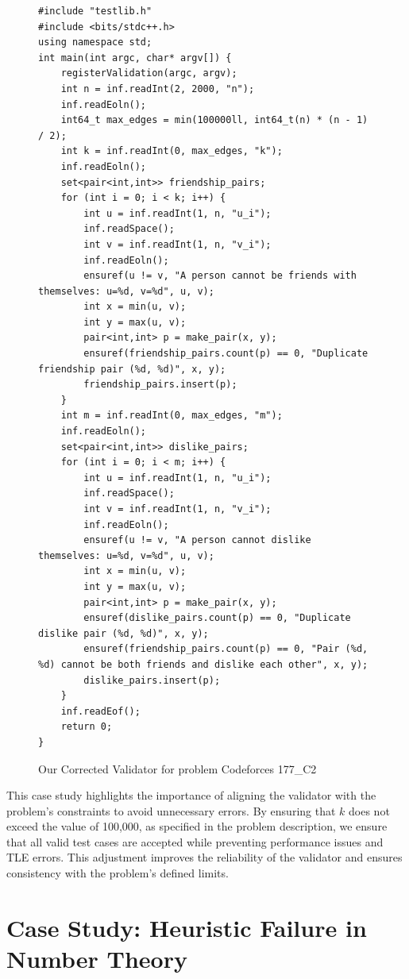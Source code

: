 \documentclass[11pt]{article}
\begin{document}
\begin{figure}[t]
\centering
\begin{minipage}{0.95\textwidth}
\begin{lstlisting}
#include "testlib.h"
#include <bits/stdc++.h>
using namespace std;
int main(int argc, char* argv[]) {
    registerValidation(argc, argv);
    int n = inf.readInt(2, 2000, "n");
    inf.readEoln();
    int64_t max_edges = min(100000ll, int64_t(n) * (n - 1) / 2);
    int k = inf.readInt(0, max_edges, "k");
    inf.readEoln();
    set<pair<int,int>> friendship_pairs;
    for (int i = 0; i < k; i++) {
        int u = inf.readInt(1, n, "u_i");
        inf.readSpace();
        int v = inf.readInt(1, n, "v_i");
        inf.readEoln();
        ensuref(u != v, "A person cannot be friends with themselves: u=%d, v=%d", u, v);
        int x = min(u, v);
        int y = max(u, v);
        pair<int,int> p = make_pair(x, y);
        ensuref(friendship_pairs.count(p) == 0, "Duplicate friendship pair (%d, %d)", x, y);
        friendship_pairs.insert(p);
    }
    int m = inf.readInt(0, max_edges, "m");
    inf.readEoln();
    set<pair<int,int>> dislike_pairs;
    for (int i = 0; i < m; i++) {
        int u = inf.readInt(1, n, "u_i");
        inf.readSpace();
        int v = inf.readInt(1, n, "v_i");
        inf.readEoln();
        ensuref(u != v, "A person cannot dislike themselves: u=%d, v=%d", u, v);
        int x = min(u, v);
        int y = max(u, v);
        pair<int,int> p = make_pair(x, y);
        ensuref(dislike_pairs.count(p) == 0, "Duplicate dislike pair (%d, %d)", x, y);
        ensuref(friendship_pairs.count(p) == 0, "Pair (%d, %d) cannot be both friends and dislike each other", x, y);
        dislike_pairs.insert(p);
    }
    inf.readEof();
    return 0;
}
\end{lstlisting}
\end{minipage}
\caption{Our Corrected Validator for problem Codeforces 177\_{C2}}
\label{fig:correct-validator2}
\end{figure}

This case study highlights the importance of aligning the validator with the problem's constraints to avoid unnecessary errors. By ensuring that $k$ does not exceed the value of 100,000, as specified in the problem description, we ensure that all valid test cases are accepted while preventing performance issues and TLE errors. This adjustment improves the reliability of the validator and ensures consistency with the problem's defined limits.

\clearpage
\newpage
\section{Case Study: Heuristic Failure in Number Theory}
\label{appx:quadratic_set}
\end{document}
